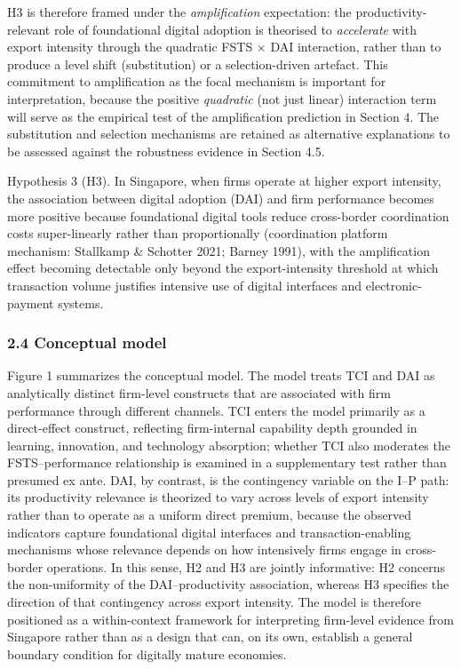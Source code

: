 \documentclass[
  12pt,a4paper]{article}
\begin{document}
H3 is therefore framed under the \emph{amplification} expectation: the
productivity-relevant role of foundational digital adoption is theorised
to \emph{accelerate} with export intensity through the quadratic FSTS ×
DAI interaction, rather than to produce a level shift (substitution) or
a selection-driven artefact. This commitment to amplification as the
focal mechanism is important for interpretation, because the positive
\emph{quadratic} (not just linear) interaction term will serve as the
empirical test of the amplification prediction in Section 4. The
substitution and selection mechanisms are retained as alternative
explanations to be assessed against the robustness evidence in Section
4.5.

Hypothesis 3 (H3). In Singapore, when firms operate at higher export
intensity, the association between digital adoption (DAI) and firm
performance becomes more positive because foundational digital tools
reduce cross-border coordination costs super-linearly rather than
proportionally (coordination platform mechanism: Stallkamp \& Schotter
2021; Barney 1991), with the amplification effect becoming detectable
only beyond the export-intensity threshold at which transaction volume
justifies intensive use of digital interfaces and electronic-payment
systems.

\hypertarget{conceptual-model}{%
\subsubsection{2.4 Conceptual model}\label{conceptual-model}}

Figure 1 summarizes the conceptual model. The model treats TCI and DAI
as analytically distinct firm-level constructs that are associated with
firm performance through different channels. TCI enters the model
primarily as a direct-effect construct, reflecting firm-internal
capability depth grounded in learning, innovation, and technology
absorption; whether TCI also moderates the FSTS--performance
relationship is examined in a supplementary test rather than presumed ex
ante. DAI, by contrast, is the contingency variable on the I--P path:
its productivity relevance is theorized to vary across levels of export
intensity rather than to operate as a uniform direct premium, because
the observed indicators capture foundational digital interfaces and
transaction-enabling mechanisms whose relevance depends on how
intensively firms engage in cross-border operations. In this sense, H2
and H3 are jointly informative: H2 concerns the non-uniformity of the
DAI--productivity association, whereas H3 specifies the direction of
that contingency across export intensity. The model is therefore
positioned as a within-context framework for interpreting firm-level
evidence from Singapore rather than as a design that can, on its own,
establish a general boundary condition for digitally mature economies.
\end{document}
